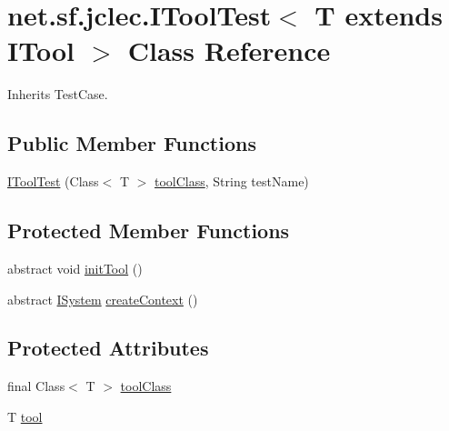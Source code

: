 \hypertarget{classnet_1_1sf_1_1jclec_1_1_i_tool_test_3_01_t_01extends_01_i_tool_01_4}{\section{net.\-sf.\-jclec.\-I\-Tool\-Test$<$ T extends I\-Tool $>$ Class Reference}
\label{classnet_1_1sf_1_1jclec_1_1_i_tool_test_3_01_t_01extends_01_i_tool_01_4}
}


Inherits Test\-Case.

\subsection*{Public Member Functions}
\begin{DoxyCompactItemize}
\item 
\hyperlink{classnet_1_1sf_1_1jclec_1_1_i_tool_test_3_01_t_01extends_01_i_tool_01_4_a502c7629e978ca6a1af1e794f32f8b8b}{I\-Tool\-Test} (Class$<$ T $>$ \hyperlink{classnet_1_1sf_1_1jclec_1_1_i_tool_test_3_01_t_01extends_01_i_tool_01_4_a143f51ba0029cc02e347ccadbfdf171f}{tool\-Class}, String test\-Name)
\end{DoxyCompactItemize}
\subsection*{Protected Member Functions}
\begin{DoxyCompactItemize}
\item 
abstract void \hyperlink{classnet_1_1sf_1_1jclec_1_1_i_tool_test_3_01_t_01extends_01_i_tool_01_4_a65a347ee996c471bd49b2df3b9749ded}{init\-Tool} ()
\item 
abstract \hyperlink{interfacenet_1_1sf_1_1jclec_1_1_i_system}{I\-System} \hyperlink{classnet_1_1sf_1_1jclec_1_1_i_tool_test_3_01_t_01extends_01_i_tool_01_4_a4d582324fa0977a0def2115682e38d9f}{create\-Context} ()
\end{DoxyCompactItemize}
\subsection*{Protected Attributes}
\begin{DoxyCompactItemize}
\item 
final Class$<$ T $>$ \hyperlink{classnet_1_1sf_1_1jclec_1_1_i_tool_test_3_01_t_01extends_01_i_tool_01_4_a143f51ba0029cc02e347ccadbfdf171f}{tool\-Class}
\item 
T \hyperlink{classnet_1_1sf_1_1jclec_1_1_i_tool_test_3_01_t_01extends_01_i_tool_01_4_ad095d35220b4ada6418bf6fbde513530}{tool}
\end{DoxyCompactItemize}


